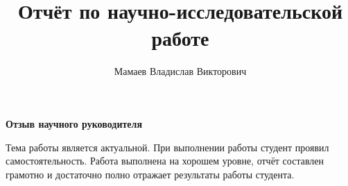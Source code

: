 \documentclass[%
bachelor,    %
subf,        %
href,        %
colorlinks,  %
]{disser}
\begin{document}

%
%



\title{Отчёт по научно-исследовательской работе}


\author{Мамаев Владислав Викторович}



\date{\number\year}

\maketitle

%
%
%
%
%
%
%
%
%
%
%


\begin{center}
	\textbf{Отзыв научного руководителя}
\end{center}

Тема работы является актуальной. При выполнении работы студент проявил самостоятельность. Работа выполнена на хорошем уровне, отчёт составлен грамотно и достаточно полно отражает результаты работы студента.  
\end{document}
